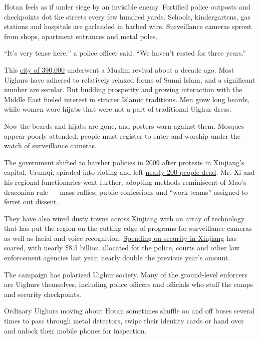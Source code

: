 Hotan feels as if under siege by an invisible enemy. Fortified police
outposts and checkpoints dot the streets every few hundred yards.
Schools, kindergartens, gas stations and hospitals are garlanded in
barbed wire. Surveillance cameras sprout from shops, apartment entrances
and metal poles.

``It's very tense here,'' a police officer said. ``We haven't rested for
three years.''

This \href{http://www.hts.gov.cn/xinxigongkai/show.php?itemid=809}{city
of 390,000} underwent a Muslim revival about a decade ago. Most Uighurs
have adhered to relatively relaxed forms of Sunni Islam, and a
significant number are secular. But budding prosperity and growing
interaction with the Middle East fueled interest in stricter Islamic
traditions. Men grew long beards, while women wore hijabs that were not
a part of traditional Uighur dress.

Now the beards and hijabs are gone, and posters warn against them.
Mosques appear poorly attended; people must register to enter and
worship under the watch of surveillance cameras.

The government shifted to harsher policies in 2009 after protests in
Xinjiang's capital, Urumqi, spiraled into rioting and left
\href{https://www.webcitation.org/5p3pHXm0l?url=http://news.xinhuanet.com/english/2009-07/18/content_11727782.htm}{nearly
200 people dead}. Mr. Xi and his regional functionaries went further,
adopting methods reminiscent of Mao's draconian rule --- mass rallies,
public confessions and ``work teams'' assigned to ferret out dissent.

They have also wired dusty towns across Xinjiang with an array of
technology that has put the region on the cutting edge of programs for
surveillance cameras as well as facial and voice recognition.
\href{http://www.xinjiangnet.com.cn/2018/0203/2044552.shtml}{Spending on
security in Xinjiang} has soared, with nearly \$8.5 billion allocated
for the police, courts and other law enforcement agencies last year,
nearly double the previous year's amount.

The campaign has polarized Uighur society. Many of the ground-level
enforcers are Uighurs themselves, including police officers and
officials who staff the camps and security checkpoints.

Ordinary Uighurs moving about Hotan sometimes shuffle on and off buses
several times to pass through metal detectors, swipe their identity
cards or hand over and unlock their mobile phones for inspection.


